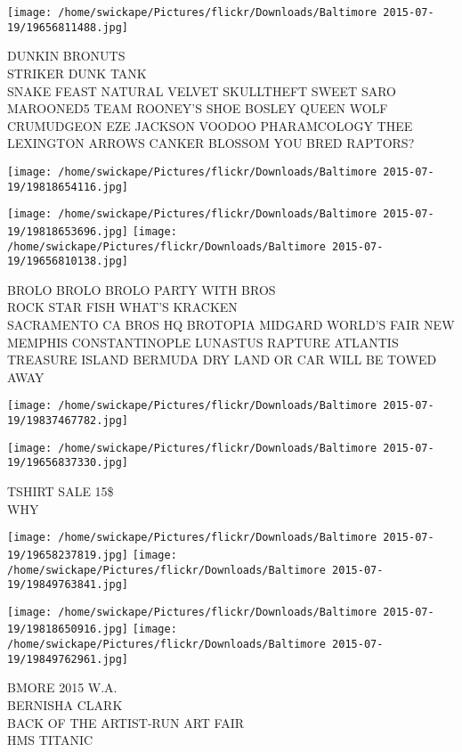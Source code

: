 \documentclass[10pt,letterpaper]{article}
\begin{document}
\texttt{[image: /home/swickape/Pictures/flickr/Downloads/Baltimore 2015-07-19/19656811488.jpg]}

DUNKIN BRONUTS\\
STRIKER DUNK TANK\\
SNAKE FEAST NATURAL VELVET SKULLTHEFT SWEET SARO MAROONED5 TEAM ROONEY'S SHOE BOSLEY QUEEN WOLF CRUMUDGEON EZE JACKSON VOODOO PHARAMCOLOGY THEE LEXINGTON ARROWS CANKER BLOSSOM YOU BRED RAPTORS?\\
\pagebreak

\texttt{[image: /home/swickape/Pictures/flickr/Downloads/Baltimore 2015-07-19/19818654116.jpg]}

\vspace{0.25in}
\texttt{[image: /home/swickape/Pictures/flickr/Downloads/Baltimore 2015-07-19/19818653696.jpg]}
\texttt{[image: /home/swickape/Pictures/flickr/Downloads/Baltimore 2015-07-19/19656810138.jpg]}

BROLO BROLO BROLO PARTY WITH BROS\\
ROCK STAR FISH WHAT'S KRACKEN\\
SACRAMENTO CA BROS HQ BROTOPIA MIDGARD WORLD'S FAIR NEW MEMPHIS CONSTANTINOPLE LUNASTUS RAPTURE ATLANTIS TREASURE ISLAND BERMUDA DRY LAND OR CAR WILL BE TOWED AWAY\\
\pagebreak

\texttt{[image: /home/swickape/Pictures/flickr/Downloads/Baltimore 2015-07-19/19837467782.jpg]}

\vspace{0.25in}
\texttt{[image: /home/swickape/Pictures/flickr/Downloads/Baltimore 2015-07-19/19656837330.jpg]}

TSHIRT SALE 15\$\\
WHY\\
\pagebreak

\texttt{[image: /home/swickape/Pictures/flickr/Downloads/Baltimore 2015-07-19/19658237819.jpg]}
\texttt{[image: /home/swickape/Pictures/flickr/Downloads/Baltimore 2015-07-19/19849763841.jpg]}

\texttt{[image: /home/swickape/Pictures/flickr/Downloads/Baltimore 2015-07-19/19818650916.jpg]}
\texttt{[image: /home/swickape/Pictures/flickr/Downloads/Baltimore 2015-07-19/19849762961.jpg]}

BMORE 2015 W.A.\\
BERNISHA CLARK\\
BACK OF THE ARTIST{-}RUN ART FAIR\\
HMS TITANIC\\
\pagebreak
\end{document}
